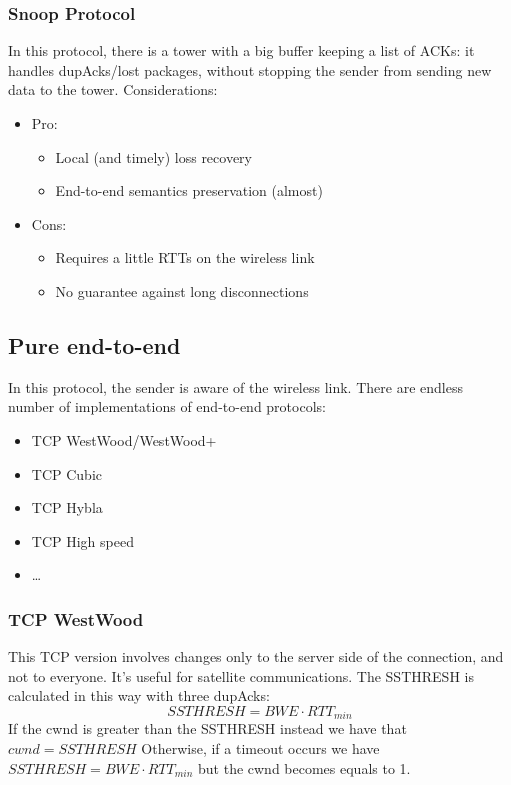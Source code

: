 \subsubsection{Snoop Protocol} In this protocol, there is a tower with a big
buffer keeping a list of ACKs: it handles dupAcks/lost packages, without
stopping the sender from sending new data to the tower.
Considerations:
\begin{itemize}
\item Pro:
  \begin{itemize}
  \item Local (and timely) loss recovery
  \item End-to-end semantics preservation (almost)
  \end{itemize}
\item Cons:
  \begin{itemize}
  \item Requires a little RTTs on the wireless link
  \item No guarantee against long disconnections
  \end{itemize}
\end{itemize}

\subsection{Pure end-to-end} In this protocol, the sender is aware of the wireless
link. There are endless number of implementations of end-to-end protocols:
\begin{itemize}
\item TCP WestWood/WestWood+
\item TCP Cubic
\item TCP Hybla
\item TCP High speed
\item \dots
\end{itemize}

\subsubsection{TCP WestWood} This TCP version involves changes only to the
server side of the connection, and not to everyone. It's useful for satellite
communications.
The SSTHRESH is calculated in this way with three dupAcks:
\begin{equation}
SSTHRESH = BWE \cdot RTT_{min}
\end{equation}
If the cwnd is greater than the SSTHRESH instead we have that $cwnd=SSTHRESH$
Otherwise, if a timeout occurs we have $SSTHRESH = BWE \cdot RTT_{min}$ but the
cwnd becomes equals to 1.

